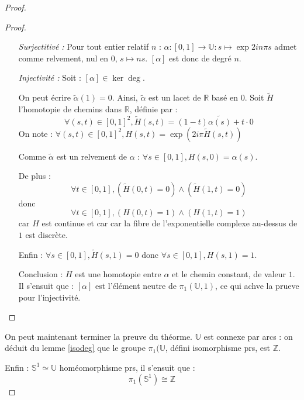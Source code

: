 \begin{proof}
\begin{proof}
\begin{itemize}
\par
Nous avons montr\'e la propri\'et\'e de rel\`evement pour $\tilde{\gamma}$.

\par
Ainsi : $\tilde{\gamma}=\tilde{\alpha\cdot\beta}$, ce qui entra\^ine : $\tilde{\alpha\cdot\beta} (1)=\tilde{\alpha}(1)+\tilde{\beta}(1)$. Il s'ensuit que :
\[\deg [\alpha\cdot\beta ]=\deg [\alpha ]+\deg [\beta ]\]
%
\item[\textit{Surjectitiv\'e :}]
Pour tout entier relatif $n$ : $\alpha :[0,1]\rightarrow \mathbb{U}:s\mapsto \exp{2in\pi s}$ admet comme relvement, nul en $0$, $s\mapsto ns$. %
$[\alpha]$ est donc de degr\'e $n$.
%
\item[\textit{Injectivit\'e :}]
Soit : $[\alpha]\in\ker\deg$.

\par
On peut \'ecrire $\tilde{\alpha}(1)=0$. Ainsi, $\tilde{\alpha}$ est un lacet de $\mathbb{R}$ bas\'e en $0$. Soit $\tilde{H}$ l'homotopie de chemins dans $\mathbb{R}$, d\'efinie par :
\[\forall (s,t)\in [0,1]^2,\tilde{H}(s,t)=(1-t)\tilde{\alpha (s)}+t\cdot 0\]
On note : $\forall (s,t)\in[0,1]^2,H(s,t)=\exp(2i\pi \tilde{H}(s,t))$

\par
Comme $\tilde{\alpha}$ est un relvement de $\alpha$ : $\forall s\in[0,1],H(s,0)=\alpha (s)$. 

\par
De plus :
\[\forall t\in[0,1],\left(\tilde{H}(0,t)=0\right)\wedge\left(\tilde{H}(1,t)=0\right)\]
donc
\[\forall t\in[0,1],\left(H(0,t)=1\right)\wedge\left(H(1,t)=1\right)\]
car $H$ est continue et car car la fibre de l'exponentielle complexe au-dessus de $1$ est discr\`ete.

\par
Enfin : $\forall s\in[0,1],\tilde{H}(s,1)=0$ donc $\forall s\in[0,1],H(s,1)=1$.

\par
Conclusion : $H$ est une homotopie entre $\alpha$ et le chemin constant, de valeur $1$. %
Il s'ensuit que : $[\alpha]$ est l'\'el\'ement neutre de $\pi_1(\mathbb{U},1)$, ce qui achve la prueve pour l'injectivit\'e.
\end{itemize}
\end{proof}

On peut maintenant terminer la preuve du th\'eorme. $\mathbb{U}$ est connexe par arcs : on d\'eduit du lemme \ref{isodeg} que le groupe $\pi_1(\mathbb{U}$, d\'efini  isomorphisme prs, est $\mathbb{Z}$.

Enfin : $\mathbb{S}^1\simeq\mathbb{U}$  hom\'eomorphisme prs, il s'ensuit que :\[\pi_1(\mathbb{S}^1)\cong\mathbb{Z}\]
\end{proof}

